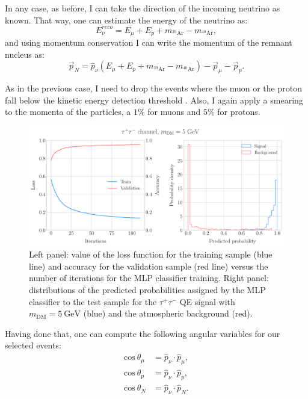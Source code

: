 In any case, as before, I can take the direction of the incoming neutrino as known. That way, one can estimate the energy of the neutrino as:
\begin{equation}\label{6.6}
	E_{\nu}^{reco} = E_{\mu} + E_{p} + m_{^{39}\mathrm{Ar}} - m_{^{40}\mathrm{Ar}},
\end{equation}
and using momentum conservation I can write the momentum of the remnant nucleus as:
\begin{equation}\label{6.7}
	\vec{p}_{N} = \hat{p}_{\nu} \left(E_{\mu} + E_{p} + m_{^{39}\mathrm{Ar}} - m_{^{40}\mathrm{Ar}}\right) - \vec{p}_{\mu} - \vec{p}_{p}.
\end{equation}

As in the previous case, I need to drop the events where the muon or the proton fall below the kinetic energy detection threshold \cite{DUNE2020TDR2}. Also, I again apply a smearing to the momenta of the particles, a $1\%$ for muons and $5\%$ for protons.

\begin{figure}[t]
	\centering
	\includegraphics[width=0.95\linewidth]{Images/DM_Analysis/solardm_tau_5_qel_classifier.pdf}
	\caption[Performance of the MLP classifier for the $\tau^{+}\tau^{-}$ QE signal with $m_{\mathrm{DM}} = 5 \ \mathrm{GeV}$.]{Left panel: value of the loss function for the training sample (blue line) and accuracy for the validation sample (red line) versus the number of iterations for the MLP classifier training. Right panel: distributions of the predicted probabilities assigned by the MLP classifier to the test sample for the $\tau^{+}\tau^{-}$ QE signal with $m_{\mathrm{DM}} = 5 \ \mathrm{GeV}$ (blue) and the atmospheric background (red).}
	\label{fig:solardm_tau_5_qel_classifier}
\end{figure}

Having done that, one can compute the following angular variables for our selected events:
\begin{align}
	\mathrm{cos} \ \theta_{\mu} &= \hat{p}_{\nu} \cdot \hat{p}_{\mu},\label{6.8} \\
	\mathrm{cos} \ \theta_{p} &= \hat{p}_{\nu} \cdot \hat{p}_{p},\label{6.9} \\
	\mathrm{cos} \ \theta_{N} &= \hat{p}_{\nu} \cdot \hat{p}_{N}. \label{6.10}
\end{align}

